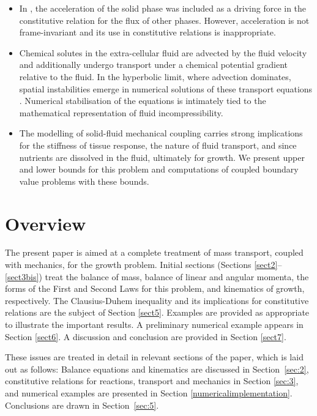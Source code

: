 \begin{itemize}
\item[\textbullet] In \citet{growthpaper}, the acceleration of the
  solid phase was included as a driving force in the constitutive
  relation for the flux of other phases. However, acceleration is not
  frame-invariant and its use in constitutive relations is
  inappropriate.

\item[\textbullet] Chemical solutes in the extra-cellular fluid are
  advected by the fluid velocity and additionally undergo transport
  under a chemical potential gradient relative to the fluid. In the
  hyperbolic limit, where advection dominates, spatial instabilities
  emerge in numerical solutions of these transport equations
  \citep{Brooks:82, Paper6}. Numerical stabilisation of the equations
  is intimately tied to the mathematical representation of fluid
  incompressibility.

\item[\textbullet] The modelling of solid-fluid mechanical coupling
  carries strong implications for the stiffness of tissue response,
  the nature of fluid transport, and since nutrients are dissolved in
  the fluid, ultimately for growth. We present upper and lower bounds
  for this problem and computations of coupled boundary value problems with
  these bounds.
\end{itemize}

\section{Overview}
\label{overview}

The present paper is aimed at a complete treatment of mass
transport, coupled with mechanics, for the growth problem. Initial
sections (Sections \ref{sect2}--\ref{sect3bis}) treat the balance
of mass, balance of linear and angular momenta, the forms of the
First and Second Laws for this problem, and kinematics of growth,
respectively. The Clausius-Duhem inequality and its implications
for constitutive relations are the subject of Section \ref{sect5}.
Examples are provided as appropriate to illustrate the important
results. A preliminary numerical example appears in Section
\ref{sect6}. A discussion and conclusion are provided in Section
\ref{sect7}.

These issues are treated in detail in relevant sections of the paper,
which is laid out as follows: Balance equations and kinematics are
discussed in Section~\ref{sec:2}, constitutive relations for
reactions, transport and mechanics in Section \ref{sec:3}, and
numerical examples are presented in Section
\ref{numericalimplementation}. Conclusions are drawn in
Section~\ref{sec:5}.
